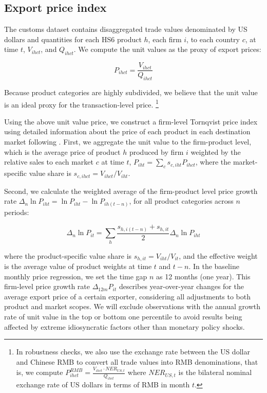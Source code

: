 \subsection{Export price index}

The customs dataset contains disaggregated trade values denominated by US dollars and quantities for each HS6 product $h$, each firm $i$, to each country $c$, at time $t$, $V_{ihct}$, and $Q_{ihct}$. We compute the unit values as the proxy of export prices:

$$
P_{ihct}=\frac{V_{ihct}}{Q_{ihct}}
$$

\noindent Because product categories are highly subdivided, we believe that the unit value is an ideal proxy for the transaction-level price. \footnote{In robustness checks, we also use the exchange rate between the US dollar and Chinese RMB to convert all trade values into RMB denominations, that is, we compute $P^{RMB}_{ihct}=\frac{V_{ihct} \cdot NER_{US,t}}{Q_{ihct}}$ where $NER_{US,t}$ is the bilateral nominal exchange rate of US dollars in terms of RMB in month $t$.}

Using the above unit value price, we construct a firm-level Tornqvist price index using detailed information about the price of each product in each destination market following \cite{smeets2013estimating}. First, we aggregate the unit value to the firm-product level, which is the average price of product $h$ produced by firm $i$ weighted by the relative sales to each market $c$ at time $t$, $P_{iht}=\sum_c s_{c,iht} P_{ihct}$, where the market-specific value share is $s_{c,ihct}=V_{ihct}/V_{iht}$. 

Second, we calculate the weighted average of the firm-product level price growth rate $\Delta_n \ln P_{iht} = \ln P_{iht}- \ln P_{ih(t-n)}$, for all product categories across $n$ periods: 

$$
\Delta_n \ln P_{it} = \sum _{h} \frac{s_{h,i(t-n)}+s_{h,it}}{2} \Delta_n \ln P_{iht}
$$

\noindent where the product-specific value share is $s_{h,it}=V_{iht}/V_{it}$, and the effective weight is the average value of product weights at time $t$ and $t-n$. In the baseline monthly price regression, we set the time gap $n$ as 12 months (one year). This firm-level price growth rate $\Delta_{12m} P_{it}$ describes year-over-year changes for the average export price of a certain exporter, considering all adjustments to both product and market scopes. We will exclude observations with the annual growth rate of unit value in the top or bottom one percentile to avoid results being affected by extreme idiosyncratic factors other than monetary policy shocks.

